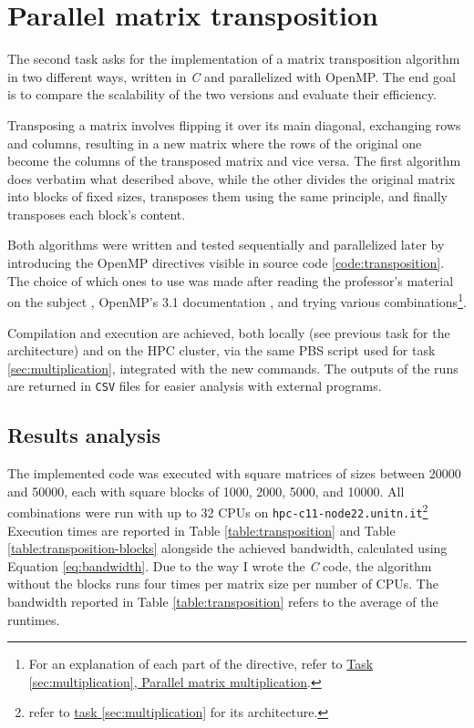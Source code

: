 \section{Parallel matrix transposition}\label{sec:transposition}

The second task asks for the implementation of a matrix transposition algorithm in %
two different ways, written in \textit{C} and parallelized with OpenMP. The end %
goal is to compare the scalability of the two versions and evaluate their efficiency.

Transposing a matrix involves flipping it over its main diagonal, exchanging %
rows and columns, resulting in a new matrix where the rows of the original one %
become the columns of the transposed matrix and vice versa. The first algorithm %
does verbatim what described above, while the other divides the original %
matrix into blocks of fixed sizes, transposes them using the same principle, %
and finally transposes each block's content.

Both algorithms were written and tested sequentially and parallelized later %
by introducing the OpenMP directives visible in source code \ref{code:transposition}. %
The choice of which ones to use was made after reading the professor's material %
on the subject \cite{prof-slides}, OpenMP's 3.1 documentation \cite{openmp-cs, openmp-docs}, %
and trying various combinations\footnote{For an explanation of each part of the directive, %
refer to \hyperref[sec:multiplication]{Task \ref*{sec:multiplication}, Parallel %
matrix multiplication}.}.



Compilation and execution are achieved, both locally (see previous task for the %
architecture) and on the HPC cluster, via the same PBS script used for task %
\ref*{sec:multiplication}, integrated with the new commands. The outputs of the %
runs are returned in \texttt{CSV} files for easier analysis with external programs.

\subsection*{Results analysis}
The implemented code was executed with square matrices of sizes between 20000 %
and 50000, each with square blocks of 1000, 2000, 5000, and 10000. All combinations %
were run with up to 32 CPUs on \texttt{hpc-c11-node22.unitn.it}\footnote{refer to %
\hyperref[sec:multiplication]{task \ref*{sec:multiplication}} for its architecture.} %
Execution times are reported in Table \ref{table:transposition} and Table %
\ref{table:transposition-blocks} alongside the achieved bandwidth, calculated %
using Equation \ref{eq:bandwidth}. Due to the way I wrote the \textit{C} code, %
the algorithm without the blocks runs four times per matrix size per number of %
CPUs. The bandwidth reported in Table \ref{table:transposition} refers to the %
average of the runtimes.\\%

